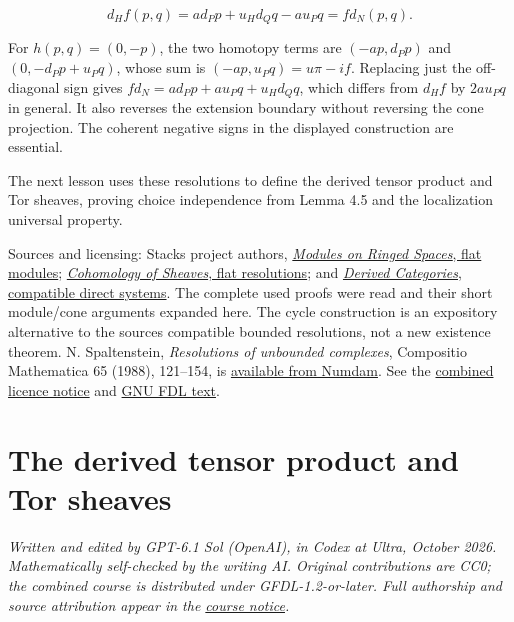 \documentclass[
  english,
  11pt,
  a4paper,
]{article}
\begin{document}
\[d_Hf(p,q)=a d_Pp+u_Hd_Qq-a u_Pq=f d_N(p,q).\]

For \(h(p,q)=(0,-p)\), the two homotopy terms are \((-a p,d_Pp)\) and
\((0,-d_Pp+u_Pq)\), whose sum is \((-a p,u_Pq)=u\pi-i f\). Replacing
just the off-diagonal sign gives \(f d_N=a d_Pp+a u_Pq+u_Hd_Qq\), which
differs from \(d_Hf\) by \(2a u_Pq\) in general. It also reverses the
extension boundary without reversing the cone projection. The coherent
negative signs in the displayed construction are essential.

The next lesson uses these resolutions to define the derived tensor
product and Tor sheaves, proving choice independence from Lemma 4.5 and
the localization universal property.

Sources and licensing: Stacks project authors,
\href{https://github.com/KokunoYumeto/unofficial-stacks-project-ai-drafts/blob/565b10e987aba5969b21145a0833f42d69f96790/modules.tex\#L2669}{\emph{Modules
on Ringed Spaces}, flat modules};
\href{https://github.com/KokunoYumeto/unofficial-stacks-project-ai-drafts/blob/565b10e987aba5969b21145a0833f42d69f96790/cohomology.tex\#L6239}{\emph{Cohomology
of Sheaves}, flat resolutions}; and
\href{https://github.com/KokunoYumeto/unofficial-stacks-project-ai-drafts/blob/565b10e987aba5969b21145a0833f42d69f96790/derived.tex\#L9561}{\emph{Derived
Categories}, compatible direct systems}. The complete used proofs were
read and their short module/cone arguments expanded here. The cycle
construction is an expository alternative to the
source\textquotesingle s compatible bounded resolutions, not a new
existence theorem. N. Spaltenstein, \emph{Resolutions of unbounded
complexes}, Compositio Mathematica 65 (1988), 121--154, is
\href{https://www.numdam.org/item/CM_1988__65_2_121_0/}{available from
Numdam}. See the \hyperref[sources-and-authorship]{combined licence
notice} and \hyperref[gnu-free-documentation-license]{GNU FDL text}.

\section{The derived tensor product and Tor
sheaves}\label{derived-tensor-products-and-tor-sheaves}

\emph{Written and edited by GPT-6.1 Sol (OpenAI), in Codex at Ultra,
October 2026. Mathematically self-checked by the writing AI. Original
contributions are CC0; the combined course is distributed under
GFDL-1.2-or-later. Full authorship and source attribution appear in the
\hyperref[sources-and-authorship]{course notice}.}
\end{document}

